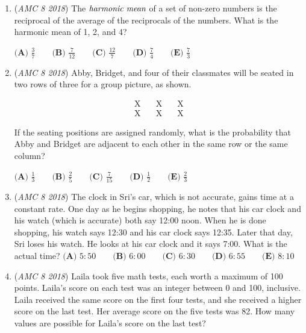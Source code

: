 \begin{enumerate}
 $\textbf{(A) }48\qquad\textbf{(B) }87\qquad\textbf{(C) }91\qquad\textbf{(D) }96\qquad \textbf{(E) }120$


	\item (\textit{AMC 8 2018}) The $\emph{harmonic mean}$ of a set of non-zero numbers is the reciprocal of the average of the reciprocals of the numbers. What is the harmonic mean of 1, 2, and 4?


 $\textbf{(A) }\frac{3}{7}\qquad\textbf{(B) }\frac{7}{12}\qquad\textbf{(C) }\frac{12}{7}\qquad\textbf{(D) }\frac{7}{4}\qquad \textbf{(E) }\frac{7}{3}$


	\item (\textit{AMC 8 2018}) Abby, Bridget, and four of their classmates will be seated in two rows of three for a group picture, as shown.


 
 \begin{eqnarray*} \text{X}&\quad\text{X}\quad&\text{X} \\ \text{X}&\quad\text{X}\quad&\text{X}  \end{eqnarray*}


 If the seating positions are assigned randomly, what is the probability that Abby and Bridget are adjacent to each other in the same row or the same column?


 $\textbf{(A) } \frac{1}{3} \qquad \textbf{(B) } \frac{2}{5} \qquad \textbf{(C) } \frac{7}{15} \qquad \textbf{(D) } \frac{1}{2} \qquad \textbf{(E) } \frac{2}{3}$


	\item (\textit{AMC 8 2018}) The clock in Sri's car, which is not accurate, gains time at a constant rate. One day as he begins shopping, he notes that his car clock and his watch (which is accurate) both say 12:00 noon. When he is done shopping, his watch says 12:30 and his car clock says 12:35. Later that day, Sri loses his watch. He looks at his car clock and it says 7:00. What is the actual time?
$\textbf{(A) }5:50\qquad\textbf{(B) }6:00\qquad\textbf{(C) }6:30\qquad\textbf{(D) }6:55\qquad \textbf{(E) }8:10$


	\item (\textit{AMC 8 2018}) Laila took five math tests, each worth a maximum of 100 points. Laila's score on each test was an integer between 0 and 100, inclusive. Laila received the same score on the first four tests, and she received a higher score on the last test. Her average score on the five tests was 82. How many values are possible for Laila's score on the last test?



\end{enumerate}
